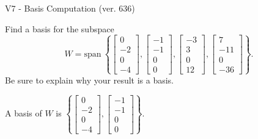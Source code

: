 \begin{exercise}
  \begin{exerciseTitle}V7 - Basis Computation (ver. 636)\end{exerciseTitle}
  \begin{exerciseStatement}
    Find a basis for the subspace 
\[W=\mathrm{span}\ \left\{\left[\begin{array}{r}
0 \\
-2 \\
0 \\
-4
\end{array}\right] , \left[\begin{array}{r}
-1 \\
-1 \\
0 \\
0
\end{array}\right] , \left[\begin{array}{r}
-3 \\
3 \\
0 \\
12
\end{array}\right] , \left[\begin{array}{r}
7 \\
-11 \\
0 \\
-36
\end{array}\right]\right\}.\]
 Be sure to explain why your result is a basis.


  \end{exerciseStatement}
  \begin{exerciseAnswer}
   A basis of \(W\) is  \(\left\{\left[\begin{array}{r}
0 \\
-2 \\
0 \\
-4
\end{array}\right] , \left[\begin{array}{r}
-1 \\
-1 \\
0 \\
0
\end{array}\right]\right\}\).
  


  \end{exerciseAnswer}
\end{exercise}